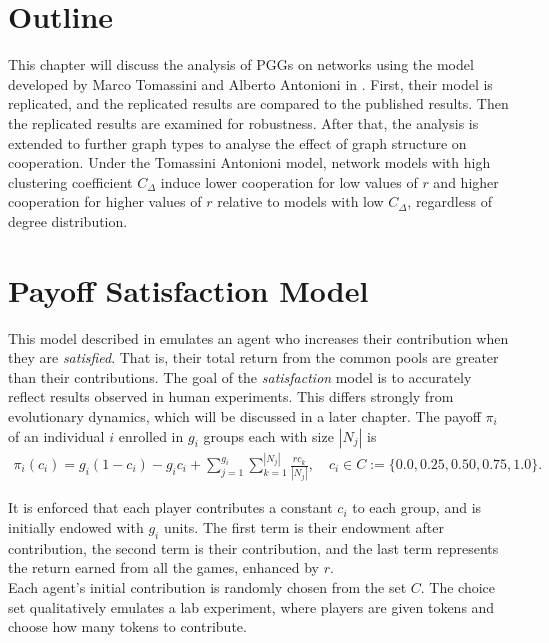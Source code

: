 

\section{Outline}
This chapter will discuss the analysis of PGGs on networks using the model developed by Marco Tomassini and Alberto Antonioni in \cite{RN49}. First, their model is replicated, and the replicated results are compared to the published results. Then the replicated results are examined for robustness. After that, the analysis is extended to further graph types to analyse the effect of graph structure on cooperation. Under the Tomassini Antonioni model, network models with high clustering coefficient $C_\Delta$ induce lower cooperation for low values of $r$ and higher cooperation for higher values of $r$ relative to models with low $C_\Delta$, regardless of degree distribution. \\

\section{Payoff Satisfaction Model}
This model described in \cite{RN49} emulates an agent who increases their contribution when they are \emph{satisfied}. That is, their total return from the common pools are greater than their contributions. The goal of the \emph{satisfaction} model is to accurately reflect results observed in human experiments. This differs strongly from evolutionary dynamics, which will be discussed in a later chapter. The payoff $\pi_i$ of an individual $i$ enrolled in $g_i$ groups each with size $|N_j|$ is \\
\begin{align} 
    \pi_i(c_i) = g_i(1-c_i) - g_ic_i + \sum_{j=1}^{g_i} \sum_{k=1}^{|N_j|} \frac{rc_k}{|N_j|}, \quad c_i \in C:= \{0.0, 0.25, 0.50, 0.75, 1.0\}. 
\end{align}

It is enforced that each player contributes a constant $c_i$ to each group, and is initially endowed with $g_i$ units. The first term is their endowment after contribution, the second term is their contribution, and the last term represents the return earned from all the games, enhanced by $r$. \\

Each agent's initial contribution is randomly chosen from the set $C$. The choice set qualitatively emulates a lab experiment, where players are given tokens and choose how many tokens to contribute. \\

